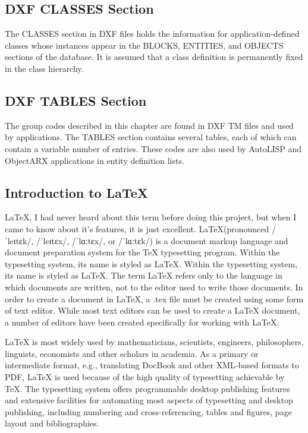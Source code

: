 \subsection{DXF CLASSES Section}
The CLASSES section in DXF files holds the information for application-defined
classes whose instances appear in the BLOCKS, ENTITIES, and OBJECTS sections
of the database. It is assumed that a class definition is permanently fixed in the
class hierarchy.

\subsection{DXF TABLES Section}
The group codes described in this chapter are found in DXF TM files and used by
applications. The TABLES section contains several tables, each of which can
contain a variable number of entries. These codes are also used by AutoLISP
and ObjectARX applications in entity definition lists.

\subsection{Introduction to \LaTeX}
\LaTeX{}, I had never heard about this term before doing this project,
but when I came to know about it's features, it is just excellent. 
\LaTeX (pronounced /ˈleɪtɛk/, /ˈleɪtɛx/, /ˈlɑːtɛx/, or /ˈlɑːtɛk/) is a 
document markup language and document preparation system for the \TeX{} 
typesetting  program. Within the typesetting system, its name is styled 
as \LaTeX.
\hspace{-1.8em} Within the typesetting system, its name is styled as \LaTeX. The term 
\LaTeX{} refers only to the language in which documents are written, 
not to the editor used to write those documents. In order to create a 
document in \LaTeX, a .tex file must be created using some form of text 
editor. While most text editors can be used to create a \LaTeX{} document, 
a number of editors have been created specifically for working with \LaTeX.

\LaTeX{} is most widely used by mathematicians, scientists, 
engineers, philosophers, linguists, economists and other scholars in 
academia. As a primary or intermediate format, e.g., translating DocBook 
and other XML-based formats to PDF, \LaTeX{} is used because of the 
high quality of typesetting achievable by \TeX. The typesetting system 
offers programmable desktop publishing features and extensive facilities 
for automating most aspects of typesetting and desktop publishing, 
including numbering and cross-referencing, tables and figures, 
page layout and bibliographies.


